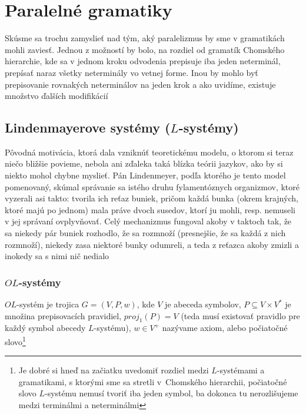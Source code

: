\chapter{Paralelné gramatiky}

Skúsme sa trochu zamyslieť nad tým, aký paralelizmus by sme v
gramatikách mohli zaviesť. Jednou z možností by bolo, na rozdiel
od gramatík Chomského hierarchie, kde sa v jednom kroku odvodenia
prepisuje iba jeden neterminál, prepísať naraz všetky neterminály
vo vetnej forme. Inou by mohlo byť prepisovanie rovnakých
neterminálov na jeden krok a ako uvidíme, existuje množstvo
ďalších modifikácií

\section{Lindenmayerove systémy ($L$-systémy)}

\begin{motiv}
Pôvodná motivácia, ktorá dala vzniknúť teoretickému modelu, o
ktorom si teraz niečo bližšie povieme, nebola ani zďaleka taká
blízka teórii jazykov, ako by si niekto mohol chybne myslieť. Pán
Lindenmeyer, podľa ktorého je tento model pomenovaný, skúmal
správanie sa istého druhu fylamentóznych organizmov, ktoré
vyzerali asi takto: tvorila ich reťaz buniek, pričom každá bunka
(okrem krajných, ktoré majú po jednom) mala práve dvoch susedov,
ktorí ju mohli, resp. nemuseli v jej správaní ovplyvňovať. Celý
mechanizmus fungoval akoby v taktoch tak, že sa niekedy pár buniek
rozhodlo, že sa rozmnoží (presnejšie, že sa každá z nich
rozmnoží), niekedy zasa niektoré bunky odumreli, a teda z reťazca
akoby zmizli a inokedy sa s nimi nič nedialo
\end{motiv}

\subsection{$OL$-systémy}

\begin{definicia}
$OL$-systém je trojica $G=(V,P,w)$, kde $V$ je abeceda symbolov,
\mbox{$P\subseteq V\times V^{*}$} je množina prepisovacích
pravidiel, $proj_{1}(P)=V$ (teda musí existovať pravidlo pre každý
symbol abecedy $L$-systému), $w\in V^{+}$ nazývame axiom, alebo
počiatočné slovo\footnote{Je dobré si hneď na začiatku uvedomiť
rozdiel medzi $L$-systémami a gramatikami, s ktorými sme sa
stretli \mbox{v Chomského} hierarchii, počiatočné slovo
$L$-systému nemusí tvoriť iba jeden symbol, ba dokonca tu
nerozlišujeme medzi terminálmi a neterminálmi}
\end{definicia}

